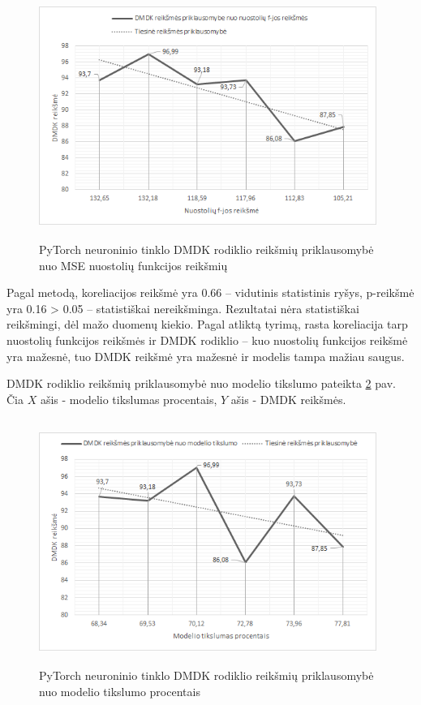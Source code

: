 \documentclass{VUMIFInfBakalaurinis}
\begin{document}
\begin{figure}[h]
  \centering
  \includegraphics[width=11cm,height=8cm,keepaspectratio]{img/pap_tyr_1.png}
  \caption{PyTorch neuroninio tinklo DMDK rodiklio reikšmių priklausomybė nuo MSE nuostolių funkcijos reikšmių}
  \label{fig:PyTorch neuroninio tinklo DMDK rodiklio reikšmių priklausomybė nuo MSE nuostolių funkcijos reikšmių}
\end{figure}

\par Pagal  metodą, koreliacijos reikšmė yra 0.66 -- vidutinis statistinis ryšys, p-reikšmė yra 0.16 > 0.05 -- statistiškai nereikšminga. Rezultatai nėra statistiškai reikšmingi, dėl mažo duomenų kiekio. Pagal atliktą tyrimą, rasta koreliacija tarp nuostolių funkcijos reikšmės ir DMDK rodiklio -- kuo nuostolių funkcijos reikšmė yra mažesnė, tuo DMDK reikšmė yra mažesnė ir modelis tampa mažiau saugus. 

\par DMDK rodiklio reikšmių priklausomybė nuo modelio tikslumo pateikta \ref{fig:PyTorch neuroninio tinklo DMDK rodiklio reikšmių priklausomybė nuo modelio tikslumo procentais} pav. Čia $X$ ašis - modelio tikslumas procentais, $Y$ ašis - DMDK reikšmės.

\begin{figure}[h]
  \centering
  \includegraphics[width=11cm,height=8cm,keepaspectratio]{img/pap_tyr_2.png}
  \caption{PyTorch neuroninio tinklo DMDK rodiklio reikšmių priklausomybė nuo modelio tikslumo procentais}
  \label{fig:PyTorch neuroninio tinklo DMDK rodiklio reikšmių priklausomybė nuo modelio tikslumo procentais}
\end{figure}
\end{document}
